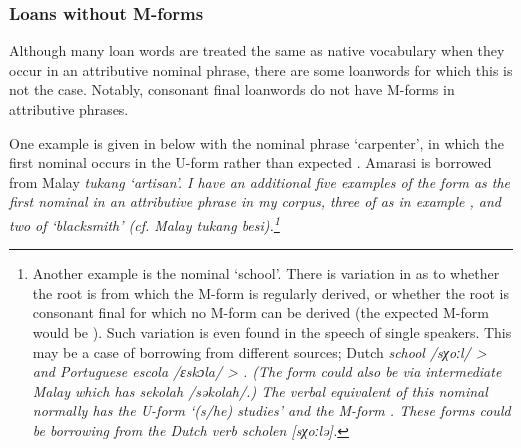 \subsubsection{Loans without M-forms}\label{sec:LoaWithoutMfo}
Although many loan words are treated the same as native vocabulary
when they occur in an attributive nominal phrase,
there are some loanwords for which this is not the case.
Notably, consonant final loanwords do not have M-forms in attributive phrases.

One example is given in  below
with the nominal phrase  `carpenter',
in which the first nominal occurs in the U-form
rather than expected .
Amarasi  is borrowed from Malay \it{tukang} `artisan'.
I have an additional five examples of the form 
as the first nominal in an attributive phrase in my corpus,
three of  as in example ,
and two of  `blacksmith' (cf. Malay \it{tukang besi}).\footnote{
		Another example is the nominal  {\tl}  `school'.
		There is variation in as to whether the root is  from which the M-form
		 is regularly derived, or whether the root is consonant final 
		for which no M-form can be derived (the expected M-form would be ).
		Such variation is even found in the speech of single speakers.
		This may be a case of borrowing from different sources;
		Dutch \it{school} /sχoːl/ >  and
		Portuguese \it{escola} /ɛskɔla/ > .
		(The form  could also be via intermediate Malay which has \it{sekolah} /səkolah/.)
		The verbal equivalent of this nominal normally has the U-form
		 `(s/he) studies' and the M-form .
		These forms could be borrowing from the Dutch verb \it{scholen} [sχoːlə].}

\begin{exe}
	\label{ex:130907-3, 1.23}
\end{exe}

